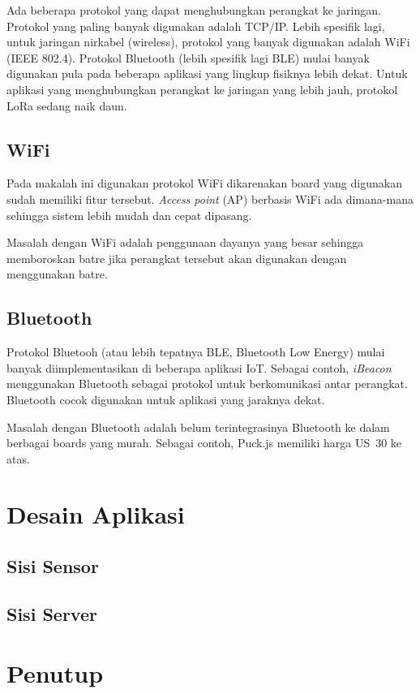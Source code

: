 \documentclass[
10pt, %
a4paper, %
oneside, %
headinclude,footinclude, %
BCOR5mm, %
]{scrartcl}
\begin{document}
Ada beberapa protokol yang dapat menghubungkan perangkat ke jaringan. Protokol
yang paling banyak digunakan adalah TCP/IP. Lebih spesifik lagi, untuk jaringan
nirkabel (wireless), protokol yang banyak digunakan adalah WiFi (IEEE 802.4).
Protokol Bluetooth (lebih spesifik lagi BLE) mulai banyak digunakan pula pada
beberapa aplikasi yang lingkup fisiknya lebih dekat. Untuk aplikasi yang
menghubungkan perangkat ke jaringan yang lebih jauh, protokol LoRa sedang naik
daun.

\subsection{WiFi}
Pada makalah ini digunakan protokol WiFi dikarenakan board yang digunakan sudah
memiliki fitur tersebut. {\em Access point} (AP) berbasis WiFi ada dimana-mana
sehingga sistem lebih mudah dan cepat dipasang.

Masalah dengan WiFi adalah penggunaan dayanya yang besar sehingga memboroskan
batre jika perangkat tersebut akan digunakan dengan menggunakan batre.

\subsection{Bluetooth}
Protokol Bluetooh (atau lebih tepatnya BLE, Bluetooth Low Energy) mulai banyak
diimplementasikan di beberapa aplikasi IoT. Sebagai contoh, {\em iBeacon}
menggunakan Bluetooth sebagai protokol untuk berkomunikasi antar perangkat. 
Bluetooth cocok digunakan untuk aplikasi yang jaraknya dekat.

Masalah dengan Bluetooth adalah belum terintegrasinya Bluetooth ke dalam
berbagai boards yang murah. Sebagai contoh, Puck.js memiliki harga US~30 ke
atas.

\section{Desain Aplikasi}
\subsection{Sisi Sensor}
\subsection{Sisi Server}

\section{Penutup}



\renewcommand{\refname}{\spacedlowsmallcaps{References}} %



\end{document}
